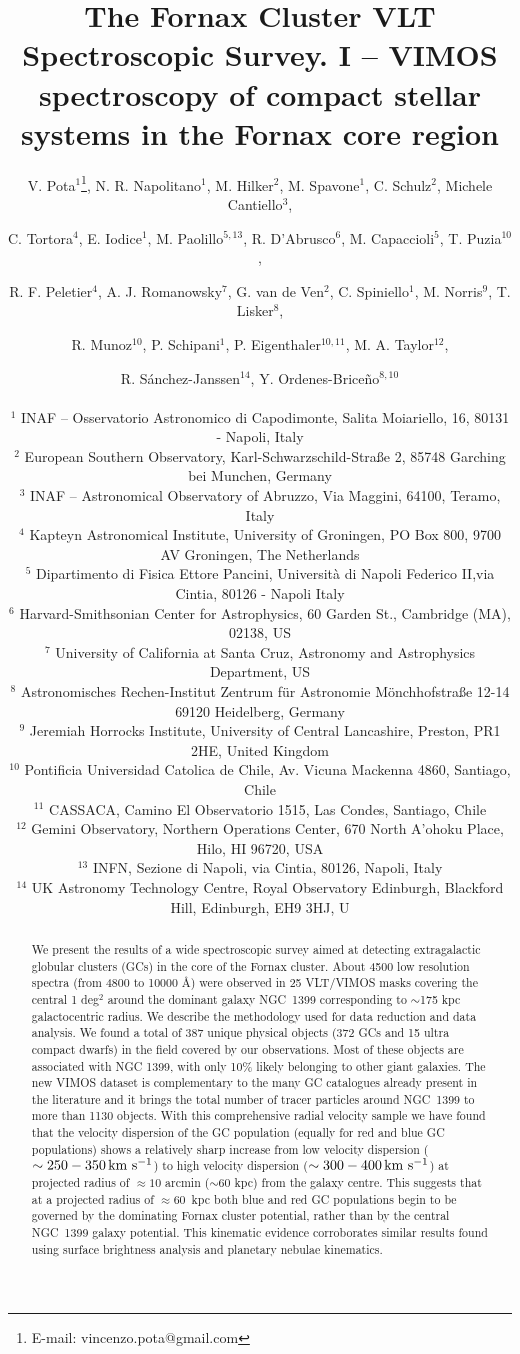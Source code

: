 \documentclass[usenatbib]{mnras}
\title[The Fornax Cluster VLT Spectroscopic Survey]{The Fornax Cluster VLT 
Spectroscopic Survey. I -- VIMOS spectroscopy of compact stellar systems in the Fornax core region}
\author[Pota et al.]{\noindent
V. Pota$^{1}$\thanks{E-mail: vincenzo.pota@gmail.com}, 
N. R. Napolitano$^{1}$, 
M. Hilker$^{2}$, 
M. Spavone$^{1}$, 
C. Schulz$^{2}$,
Michele Cantiello$^{3}$,
\and 
C. Tortora$^{4}$,
E. Iodice$^{1}$, 
M. Paolillo$^{5,13}$,
R. D'Abrusco$^{6}$,
M. Capaccioli$^{5}$, 
T. Puzia$^{10}$ ,
\and 
R. F. Peletier$^{4}$,
A. J. Romanowsky$^{7}$,
G. van de Ven$^{2}$,
C. Spiniello$^{1}$,
M. Norris$^{9}$,
T. Lisker$^{8}$,
\and 
R. Munoz$^{10}$,
P. Schipani$^{1}$,
P. Eigenthaler$^{10,11}$,
M. A. Taylor$^{12}$,
\and
R. S\'anchez-Janssen$^{14}$,
Y. Ordenes-Brice\~no$^{8,10}$
\\~\\
$^1$ INAF -- Osservatorio Astronomico di Capodimonte, Salita Moiariello, 16, 80131 - Napoli, Italy\\
$^2$ European Southern Observatory, Karl-Schwarzschild-Stra{\ss}e 2, 85748 Garching bei Munchen, Germany\\
$^3$ INAF -- Astronomical Observatory of Abruzzo, Via Maggini, 64100, Teramo, Italy\\
$^4$ Kapteyn Astronomical Institute, University of Groningen, PO Box 800, 9700 AV Groningen, The Netherlands\\
$^5$ Dipartimento di Fisica Ettore Pancini, Universit\`a di Napoli Federico II,via Cintia, 80126 - Napoli Italy\\
$^6$ Harvard-Smithsonian Center for Astrophysics, 60 Garden St., Cambridge (MA), 02138, US\\
$^7$ University of California at Santa Cruz, Astronomy and Astrophysics Department, US\\
$^8$ Astronomisches Rechen-Institut Zentrum f{\"u}r Astronomie M{\"o}nchhofstra{\ss}e 12-14 69120 Heidelberg, Germany \\
$^9$ Jeremiah Horrocks Institute, University of Central Lancashire, Preston, PR1 2HE, United Kingdom\\
$^{10}$ Pontificia Universidad Catolica de Chile, Av. Vicuna Mackenna 4860, Santiago, Chile \\
$^{11}$ CASSACA, Camino El Observatorio 1515, Las Condes, Santiago, Chile\\
$^{12}$ Gemini Observatory, Northern Operations Center, 670 North A'ohoku Place, Hilo, HI 96720, USA\\
$^{13}$ INFN, Sezione di Napoli, via Cintia, 80126, Napoli, Italy\\
$^{14}$ UK Astronomy Technology Centre, Royal Observatory Edinburgh, Blackford Hill, Edinburgh, EH9 3HJ, U
}
\newcommand{\kms}{\mbox{\,km~s$^{-1}$}}
\begin{document}
\label{firstpage}

\maketitle
\begin{abstract}
We present the results of a wide spectroscopic survey aimed at detecting 
extragalactic globular clusters (GCs) in the core of the Fornax cluster. 
About 4500 low resolution spectra (from 4800 
to 10000 \AA) were observed in 25 VLT/VIMOS masks covering the central 1 deg$^2$ 
around the dominant galaxy NGC~1399 corresponding to $\sim$175 kpc galactocentric radius. 
We describe the methodology used for data reduction and data analysis. We found a total of 
387 unique physical objects (372 GCs and 15 ultra compact dwarfs) in the field 
covered by our observations. Most of these objects are associated with NGC 1399, with only 
10\% likely belonging to other giant galaxies. 
The new VIMOS dataset is complementary to the many 
GC catalogues already present in the literature and it brings the total number 
of tracer particles around  NGC~1399 to more than 1130 objects. 
With this comprehensive radial velocity sample we have found that the velocity 
dispersion of the GC population (equally for red and blue GC populations) shows 
a relatively sharp increase from low velocity dispersion ($\sim 250-350 \kms$) 
to high velocity dispersion ($\sim 300-400 \kms$) at projected radius of $\approx10$ arcmin 
($\sim 60$ kpc) from the galaxy centre. 
This suggests that at a projected radius of $\approx60$~kpc both blue and red GC populations 
begin to be governed by the dominating Fornax cluster potential, rather than by the central 
NGC~1399 galaxy potential. This kinematic evidence corroborates similar results found using 
surface brightness analysis and planetary nebulae kinematics.
\end{abstract}
\end{document}
